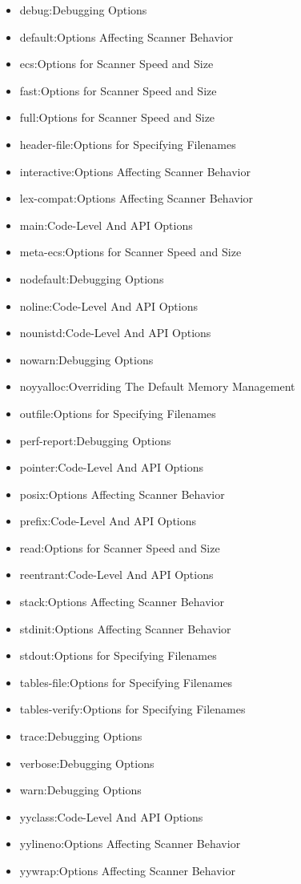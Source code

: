 \documentclass[openany,oneside]{book}
\begin{document}
\begin{itemize}
\item debug:Debugging Options
\item default:Options Affecting Scanner Behavior
\item ecs:Options for Scanner Speed and Size
\item fast:Options for Scanner Speed and Size
\item full:Options for Scanner Speed and Size
\item header-file:Options for Specifying Filenames
\item interactive:Options Affecting Scanner Behavior
\item lex-compat:Options Affecting Scanner Behavior
\item main:Code-Level And API Options
\item meta-ecs:Options for Scanner Speed and Size
\item nodefault:Debugging Options
\item noline:Code-Level And API Options
\item nounistd:Code-Level And API Options
\item nowarn:Debugging Options
\item noyyalloc:Overriding The Default Memory Management
\item outfile:Options for Specifying Filenames
\item perf-report:Debugging Options
\item pointer:Code-Level And API Options
\item posix:Options Affecting Scanner Behavior
\item prefix:Code-Level And API Options
\item read:Options for Scanner Speed and Size
\item reentrant:Code-Level And API Options
\item stack:Options Affecting Scanner Behavior
\item stdinit:Options Affecting Scanner Behavior
\item stdout:Options for Specifying Filenames
\item tables-file:Options for Specifying Filenames
\item tables-verify:Options for Specifying Filenames
\item trace:Debugging Options
\item verbose:Debugging Options
\item warn:Debugging Options
\item yyclass:Code-Level And API Options
\item yylineno:Options Affecting Scanner Behavior
\item yywrap:Options Affecting Scanner Behavior
\end{itemize}
\end{document}
